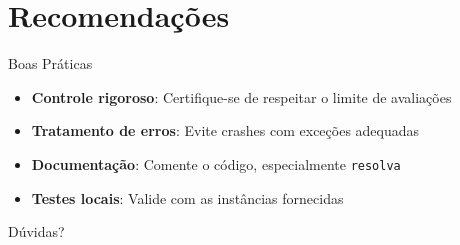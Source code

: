 \documentclass[10pt]{beamer}
\begin{document}
\section{Recomendações}

\begin{frame}{Boas Práticas}
    \begin{itemize}
        \item \textbf{Controle rigoroso}: Certifique-se de respeitar o limite de avaliações
        
        \vspace{0.3cm}
        
        \item \textbf{Tratamento de erros}: Evite crashes com exceções adequadas
        
        \vspace{0.3cm}
        
        \item \textbf{Documentação}: Comente o código, especialmente \texttt{resolva}
        
        \vspace{0.3cm}
        
        \item \textbf{Testes locais}: Valide com as instâncias fornecidas
    \end{itemize}
\end{frame}

\begin{frame}
    \begin{center}
        \Huge{Dúvidas?}
    \end{center}
\end{frame}
\end{document}
